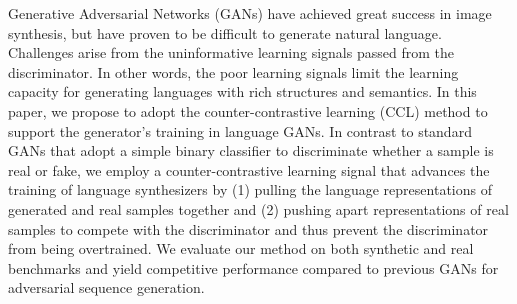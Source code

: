 Generative Adversarial Networks (GANs) have achieved great success in image synthesis, but have proven to be difficult to generate natural language. Challenges arise from the uninformative learning signals passed from the discriminator. In other words, the poor learning signals limit the learning capacity for generating languages with rich structures and semantics. In this paper, we propose to adopt the counter-contrastive learning (CCL) method to support the generator's training in language GANs. In contrast to standard GANs that adopt a simple binary classifier to discriminate whether a sample is real or fake, we employ a counter-contrastive learning signal that advances the training of language synthesizers by (1) pulling the language representations of generated and real samples together and (2) pushing apart representations of real samples to compete with the discriminator and thus prevent the discriminator from being overtrained. We evaluate our method on both synthetic and real benchmarks and yield competitive performance compared to previous GANs for adversarial sequence generation.
